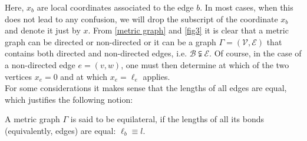 Here, $x_b$ are local coordinates associated to the edge $b$. In most cases, when this does not lead to any confusion, we will drop the subscript of the coordinate $x_b$ and denote it just by $x$. From \cref{metric graph} and \cref{fig3} it is clear that a metric graph can be directed or non-directed or it can be a graph $\Gamma = (\mathcal{V}, \mathcal{E})$ that contains both directed and non-directed edges, i.e. $\mathcal{B} \subsetneqq \mathcal{E}$. Of course, in the case of a non-directed edge $e = (v, w)$, one must then determine at which of the two vertices $x_e = 0$ and at which $x_e = \ell_e$ applies. \\
For some considerations it makes sense that the lengths of all edges are equal, which justifies the following notion:

\begin{definition}
    \label{metric graph equilateral}
    A metric graph $\Gamma$ is said to be equilateral, if the lengths of all its bonds (equivalently, edges) are equal: $\ell_b \equiv l$.
\end{definition}

